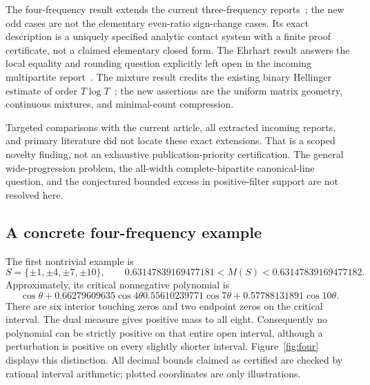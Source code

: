 The four-frequency result extends the current three-frequency
reports~\cite{ThreeIncoming}; the new odd cases are not the elementary
even-ratio sign-change cases. Its exact description is a uniquely
specified analytic contact system with a finite proof certificate,
not a claimed elementary closed form.
The Ehrhart result answers the local equality and rounding question
explicitly left open in the incoming multipartite report~\cite{EhrhartIncoming}.
The mixture result credits the existing binary Hellinger estimate
of order $T\log T$~\cite{BinaryIncoming}; the new assertions are the
uniform matrix geometry, continuous mixtures, and minimal-count
compression.

Targeted comparisons with the current article, all extracted incoming
reports, and primary literature did not locate these exact extensions.
That is a scoped novelty finding, not an exhaustive publication-priority
certification. The general wide-progression problem, the all-width
complete-bipartite canonical-line question, and the conjectured bounded
excess in positive-filter support are not resolved here.

\subsection{A concrete four-frequency example}
The first nontrivial example is
\[
S=\{\pm1,\pm4,\pm7,\pm10\},\qquad
0.63147839169477181<M(S)<0.63147839169477182.
\]
Approximately, its critical nonnegative polynomial is
\[
\cos\theta+0.66279609635\cos4\theta
0.55610239771\cos7\theta+0.57788131891\cos10\theta.
\]
There are six interior touching zeros and two endpoint zeros on the
critical interval. The dual measure gives positive mass to all eight.
Consequently no polynomial can be strictly positive on that entire
open interval, although a perturbation is positive on every slightly
shorter interval. Figure~\ref{fig:four} displays this distinction.
All decimal bounds claimed as certified are checked by rational interval
arithmetic; plotted coordinates are only illustrations.
